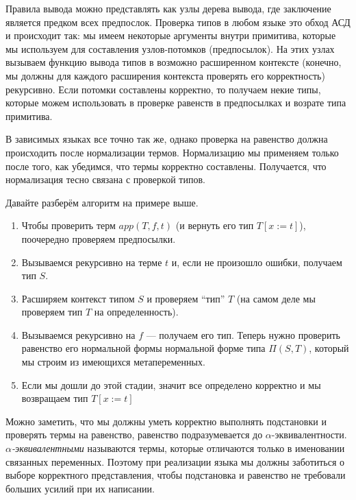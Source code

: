 Правила вывода можно представлять как узлы дерева вывода, где заключение является предком всех предпослок. Проверка типов в любом языке это обход АСД и происходит так: мы имеем некоторые аргументы внутри примитива, которые мы используем для составления узлов-потомков (предпосылок). На этих узлах вызываем функцию вывода типов в возможно расширенном контексте (конечно, мы должны для каждого расширения контекста проверять его корректность) рекурсивно. Если потомки составлены корректно, то получаем некие типы, которые можем использовать в проверке равенств в предпосылках и возрате типа примитива.

В зависимых языках все точно так же, однако проверка на равенство должна происходить после нормализации термов. Нормализацию мы применяем только после того, как убедимся, что термы корректно составлены. Получается, что нормализация тесно связана с проверкой типов.

Давайте разберём алгоритм на примере выше.
\begin{enumerate}
\item Чтобы проверить терм $app(T, f, t)$ (и вернуть его тип $T[x:=t]$), поочередно проверяем предпосылки.
\item Вызываемся рекурсивно на терме $t$ и, если не произошло ошибки, получаем тип $S$.
\item Расширяем контекст типом $S$ и проверяем ``тип'' $T$ (на самом деле мы проверяем тип $T$ на определенность).
\item Вызываемся рекурсивно на $f$ --- получаем его тип. Теперь нужно проверить равенство его нормальной формы нормальной форме типа $\Pi(S, T)$, который мы строим из имеющихся метапеременных.
\item Если мы дошли до этой стадии, значит все определено корректно и мы возвращаем тип $T[x:=t]$
\end{enumerate}

Можно заметить, что мы должны уметь корректно выполнять подстановки и проверять термы на равенство, равенство подразумевается до $\alpha$-эквивалентности. \textit{$\alpha$-эквивалентными} называются термы, которые отличаются только в именовании связанных переменных. Поэтому при реализации языка мы должны заботиться о выборе корректного представления, чтобы подстановка и равенство не требовали больших усилий при их написании.





